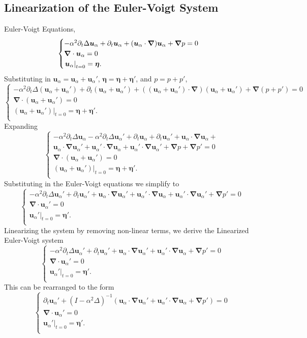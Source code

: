 \documentclass[12pt]{article}
\def\ua{\boldsymbol u_\alpha}
\def\bn{\boldsymbol \nabla}
\def\be{\boldsymbol \eta}
\numberwithin{equation}{section}
\begin{document}
\subsection{Linearization of the Euler-Voigt System}\label{app:lin:euler}
Euler-Voigt Equations,
\begin{equation}
\notag
\begin{cases}
      -\alpha^2\partial_t\Delta \ua + \partial_t \ua + (\ua\cdot\bn)\ua+\bn p = 0\\
      \bn\cdot \ua = 0\\
      \left.\ua\right\vert_{t=0} = \be.\\
    \end{cases}
\end{equation}
Substituting in $\ua=\ua+\ua'$, $\be=\be+\be'$, and $p=p+p'$,
$$\begin{cases}
      -\alpha^2\partial_t\Delta (\ua+\ua') + \partial_t (\ua+\ua') + ((\ua+\ua')\cdot\bn)(\ua+\ua')+\bn (p+p') = 0\\
      \bn\cdot (\ua+\ua') = 0\\
      \left.(\ua+\ua')\right\vert_{t=0} = \be+\be'.\\
    \end{cases}$$
Expanding
$$\begin{cases}
      -\alpha^2\partial_t\Delta \ua-\alpha^2\partial_t\Delta \ua' + \partial_t \ua+\partial_t\ua' + \ua\cdot\bn \ua + \\ \ua\cdot\bn \ua' +\ua'\cdot\bn \ua + \ua'\cdot\bn \ua' +\bn p+ \bn p' = 0\\
      \bn\cdot (\ua+\ua') = 0\\
      \left.(\ua+\ua')\right\vert_{t=0} = \be+\be'.\\
    \end{cases}$$
Substituting in the Euler-Voigt equations we simplify to
$$\begin{cases}
      -\alpha^2\partial_t\Delta \ua' + \partial_t\ua' + \ua\cdot\bn \ua' +\ua'\cdot\bn \ua + \ua'\cdot\bn \ua' + \bn p' = 0\\
      \bn\cdot \ua' = 0\\
      \left.\ua'\right\vert_{t=0} = \be'.\\
    \end{cases}$$
Linearizing the system by removing non-linear terms, we derive the Linearized Euler-Voigt system
$$\begin{cases}
      -\alpha^2\partial_t\Delta \ua' + \partial_t\ua' + \ua\cdot\bn \ua' +\ua'\cdot\bn \ua + \bn p' = 0\\
      \bn\cdot \ua' = 0\\
      \left.\ua'\right\vert_{t=0} = \be'.\\
    \end{cases}$$
This can be rearranged to the form
\begin{equation}
\begin{cases}
      \partial_t \ua'+(I-\alpha^2\Delta)^{-1}(\ua\cdot\bn \ua'+\ua'\cdot\bn \ua+\bn p')=0\\
      \bn\cdot \ua' = 0\\
      \left.\ua'\right\vert_{t=0} = \be'.\\
    \end{cases}
\end{equation}
\end{document}
